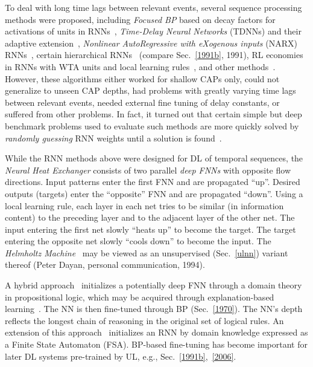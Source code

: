 \documentclass[letterpaper]{article}
\begin{document}
\begin{sloppypar}
To deal with long time lags between relevant events, 
several sequence processing methods were proposed, 
including 
{\em Focused BP} based on decay 
factors for activations of units in RNNs~\citep{Mozer:89focus,Mozer:92nips},
{\em  Time-Delay Neural Networks} (TDNNs) \citep{Lang:90} and their 
adaptive extension~\citep{Bodenhausen:91},
{\em Nonlinear AutoRegressive with eXogenous inputs} (NARX) RNNs~\citep{Lin:96},
certain hierarchical RNNs~\citep{hihi:95} (compare Sec.~\ref{1991b}, 1991),
RL economies in RNNs with WTA units and local learning rules~\citep{Schmidhuber:89cs},
and other methods~\citep[e.g.,][]{Ring:93,Ring:94,Plate:93,Vries:91,Sun:93,Bengio:94}.
However, these algorithms either worked for shallow CAPs only,
could not generalize to unseen CAP depths,
had problems with greatly varying time lags between relevant events,
needed external fine tuning of delay constants,
or suffered from other problems.
In fact, it turned out that certain simple but deep benchmark problems 
used to evaluate such methods 
are more quickly solved by {\em randomly guessing} RNN weights until a solution is found~\citep{Hochreiter:96sintra}.

While the RNN methods above were designed for DL of temporal sequences,
the {\em Neural Heat Exchanger} \citep{heat90-96} consists of two parallel {\em deep FNNs} with opposite flow directions. Input patterns enter the first FNN and are propagated ``up''. Desired outputs (targets) enter the ``opposite'' FNN and are propagated ``down''. Using a local learning rule, each layer in each net tries to be similar (in information content) to the preceding layer and to the adjacent  layer of the other net. The input entering the first net slowly ``heats up'' to become the target. The target entering the opposite net slowly ``cools down'' to become the input. The {\em Helmholtz Machine}~\citep{Dayan:95,Dayan:96} may be viewed as an unsupervised (Sec.~\ref{ulnn})
variant thereof (Peter Dayan, personal communication, 1994). 



A hybrid approach~\citep{shavlik1989,towell1994} initializes a potentially deep FNN through 
a domain theory in propositional logic,
which may be acquired through explanation-based learning~\citep{mitchell1986,dejong1986,minton1989}.
The NN is then fine-tuned through BP (Sec.~\ref{1970}).
The NN's depth reflects the longest chain of reasoning in the original set of logical rules.
An extension of this approach~\citep{maclin1993,shavlik1994} initializes an RNN by 
domain knowledge expressed as a Finite State Automaton (FSA).
BP-based fine-tuning has become important for later DL systems 
pre-trained by UL, e.g., Sec.~\ref{1991b},~\ref{2006}.


\end{sloppypar}
\end{document}
